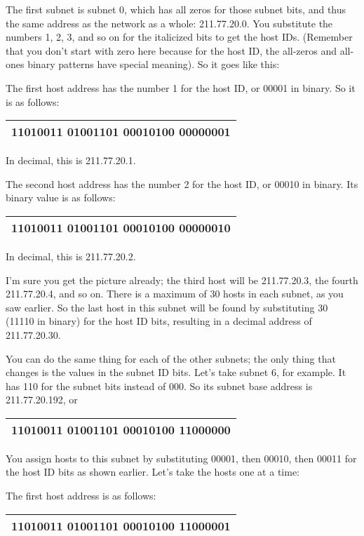 The first subnet is subnet 0, which has all zeros for those subnet bits,
and thus the same address as the network as a whole: 211.77.20.0. You
substitute the numbers 1, 2, 3, and so on for the italicized bits to get
the host IDs. (Remember that you don't start with zero here because for
the host ID, the all-zeros and all-ones binary patterns have special
meaning). So it goes like this:

The first host address has the number 1 for the host ID, or 00001 in
binary. So it is as follows:

\begin{longtable}[]{@{}l@{}}
\toprule
\endhead
11010011 01001101 00010100 {\textbf{000}}{00001}\tabularnewline
\bottomrule
\end{longtable}

In decimal, this is 211.77.20.1.

The second host address has the number 2 for the host ID, or 00010 in
binary. Its binary value is as follows:

\begin{longtable}[]{@{}l@{}}
\toprule
\endhead
11010011 01001101 00010100 {\textbf{000}}{00010}\tabularnewline
\bottomrule
\end{longtable}

In decimal, this is 211.77.20.2.

I'm sure you get the picture already; the third host will be
211.77.20.3, the fourth 211.77.20.4, and so on. There is a maximum of 30
hosts in each subnet, as you saw earlier. So the last host in this
subnet will be found by substituting 30 (11110 in binary) for the host
ID bits, resulting in a decimal address of 211.77.20.30.

You can do the same thing for each of the other subnets; the only thing
that changes is the values in the subnet ID bits. Let's take subnet 6,
for example. It has 110 for the subnet bits instead of 000. So its
subnet base address is 211.77.20.192, or

\begin{longtable}[]{@{}l@{}}
\toprule
\endhead
11010011 01001101 00010100 {\textbf{110}}{00000}\tabularnewline
\bottomrule
\end{longtable}

You assign hosts to this subnet by substituting 00001, then 00010, then
00011 for the host ID bits as shown earlier. Let's take the hosts one at
a time:

The first host address is as follows:

\begin{longtable}[]{@{}l@{}}
\toprule
\endhead
11010011 01001101 00010100 {\textbf{110}}{00001}\tabularnewline
\bottomrule
\end{longtable}

